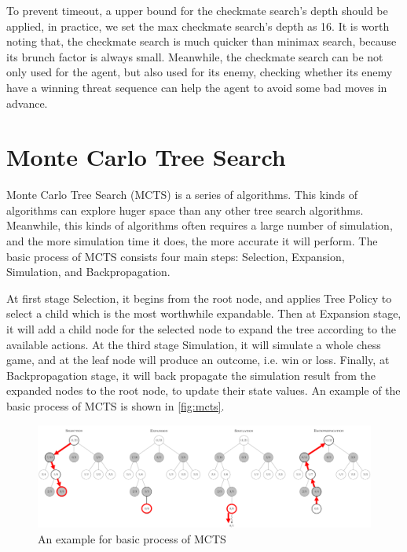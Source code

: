 \documentclass[sigconf, nonacm]{acmart}
\begin{document}
To prevent timeout, a upper bound for the checkmate search's depth should be applied, in practice, we set the max checkmate search's depth as 16. 
%
It is worth noting that, the checkmate search is much quicker than minimax search, because its brunch factor is always small. 
%
Meanwhile, the checkmate search can be not only used for the agent, but also used for its enemy, checking whether its enemy have a winning threat sequence can help the agent to avoid some bad moves in advance. 



\section{Monte Carlo Tree Search}
\quad Monte Carlo Tree Search (MCTS) is a series of algorithms. This kinds of algorithms can explore huger space than any other tree search algorithms. Meanwhile, this kinds of algorithms often requires a large number of simulation, and the more simulation time it does, the more accurate it will perform.  The basic process of MCTS consists four main steps: Selection, Expansion, Simulation, and Backpropagation.

At first stage Selection, it begins from the root node, and applies Tree Policy to select a child which is the most worthwhile expandable. Then at Expansion stage, it will add a child node for the selected node to expand the tree according to the available actions. At the third stage Simulation, it will simulate a whole chess game, and at the leaf node will produce an outcome, i.e. win or loss. Finally, at Backpropagation stage, it will back propagate the simulation result from the expanded nodes to the root node, to update their state values. An example of the basic process of MCTS is shown in \autoref{fig:mcts}.


\begin{figure}
  \centering
  \includegraphics[width=\linewidth]{figures/mct.png}
  \caption{An example for basic process of MCTS}
  \label{fig:mcts}
\end{figure}
\end{document}
